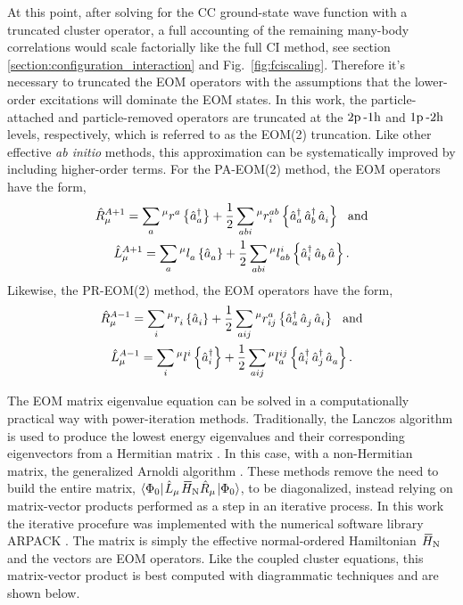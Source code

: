 \documentclass[thesis.tex]{subfiles}
\begin{document}
At this point, after solving for the CC ground-state wave function with a truncated cluster operator, a full accounting of the remaining many-body correlations would scale factorially like the full CI method, see section \ref{section:configuration_interaction} and Fig.\ \ref{fig:fciscaling}.  Therefore it's necessary to truncated the EOM operators with the assumptions that the lower-order excitations will dominate the EOM states.  In this work, the particle-attached and particle-removed operators are truncated at the $2\mathrm{p}\hspace{2pt}\text{-}1\mathrm{h}$ and $1\mathrm{p}\hspace{2pt}\text{-}2\mathrm{h}$ levels, respectively, which is referred to as the EOM(2) truncation.  Like other effective \emph{ab initio} methods, this approximation can be systematically improved by including higher-order terms.  For the PA-EOM(2) method, the EOM operators have the form, 
\begin{gather} \label{eq:pa-eom2}
  \Rop^{A+1}_{\mu} = \sum_{a}\rint{\mu}{a}{}\normord{\co{a}} + \frac{1}{2}\sum_{abi}\rint{\mu}{ab}{i}\normord{\co{a}\co{b}\ao{i}} \ \ \text{and} \notag \\
  \Lop^{A+1}_{\mu} = \sum_{a}\lint{\mu}{}{a}\normord{\ao{a}} + \frac{1}{2}\sum_{abi}\lint{\mu}{i}{ab}\normord{\co{i}\ao{b}\ao{}}.
\end{gather}
Likewise, the PR-EOM(2) method, the EOM operators have the form,
\begin{gather} \label{eq:pr-eom2}
  \Rop^{A-1}_{\mu} = \sum_{i}\rint{\mu}{}{i}\normord{\ao{i}} + \frac{1}{2}\sum_{aij}\rint{\mu}{a}{ij}\normord{\co{a}\ao{j}\ao{i}} \ \ \text{and} \notag \\
  \Lop^{A-1}_{\mu} = \sum_{i}\lint{\mu}{i}{}\normord{\co{i}} + \frac{1}{2}\sum_{aij}\lint{\mu}{ij}{a}\normord{\co{i}\co{j}\ao{a}}.
\end{gather}

The EOM matrix eigenvalue equation can be solved in a computationally practical way with power-iteration methods.  Traditionally, the Lanczos algorithm is used to produce the lowest energy eigenvalues and their corresponding eigenvectors from a Hermitian matrix \cite{LANCZOS1950}.  In this case, with a non-Hermitian matrix, the generalized Arnoldi algorithm \cite{ARNOLDI1951}.  These methods remove the need to build the entire matrix, $\element{\Ref}{\Lop_{\mu}\EHamN\Rop_{\mu}}{\Ref}$, to be diagonalized, instead relying on matrix-vector products performed as a step in an iterative process.  In this work the iterative procefure was implemented with the numerical software library ARPACK \cite{ARPACK1998}.  The matrix is simply the effective normal-ordered Hamiltonian $\EHamN$ and the vectors are EOM operators.  Like the coupled cluster equations, this matrix-vector product is best computed with diagrammatic techniques and are shown below.
\end{document}
